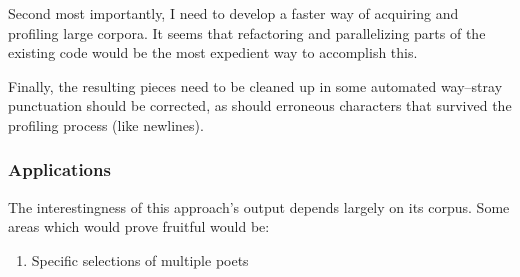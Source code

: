 \documentclass[10pt]{article}
\begin{document}
Second most importantly, I need to develop a faster way of acquiring and
profiling large corpora. It seems that refactoring and parallelizing parts of
the existing code would be the most expedient way to accomplish this.

Finally, the resulting pieces need to be cleaned up in some automated
way--stray punctuation should be corrected, as should erroneous characters that
survived the profiling process (like newlines).
\subsubsection{Applications}
The interestingness of this approach's output depends largely on its corpus. Some areas which would prove fruitful would be:
\onehalfspacing
\begin{enumerate}
\item Specific selections of multiple poets
\end{enumerate}
\doublespacing



\end{document}

